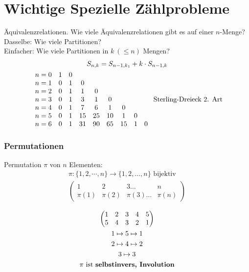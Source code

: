 \section{Wichtige Spezielle Zählprobleme}
Äquivalenzrelationen. Wie viele Äquivalenzrelationen gibt es auf einer $n$-Menge? \\
Dasselbe: Wie viele Partitionen? \\
Einfacher: Wie viele Partitionen in $k ~(\leq n)$ Mengen? \\
\begin{gather*}
	S_{n,k} = S_{n-1,k_1}+ k \cdot S_{n-1,k} \\
	\begin{array}{ c c c c c c c c c }
		n=0	&1	&0	\\
		n=1	&0	&1	&0	\\
		n=2	&0	&1	&1	&0	\\
		n=3	&0	&1	&3	&1	&0	\\
		n=4	&0	&1	&7	&6	&1	&0	\\
		n=5	&0	&1	&15	&25	&10	&1	&0	\\
		n=6	&0	&1	&31	&90	&65	&15	&1	&0	\\
	\end{array} \text{ Sterling-Dreieck 2. Art}\index{Stirling-Dreieck!2. Art}
\end{gather*}

\subsubsection{Permutationen}
Permutation $\pi$ von $n$ Elementen: \\
\begin{gather*}
	\pi : \{ 1, 2, \cdots , n \} \rightarrow \{ 1, 2, \dotsc , n \} \text{ bijektiv} \\
	\begin{pmatrix}
		1		&2		&3		\dots		&n		\\
		\pi(1)		&\pi(2)	&\pi(3)	\dots		&\pi(n)
	\end{pmatrix}
\end{gather*}
\begin{bsp*}
	\begin{gather*}
		\begin{pmatrix}
			1	&2	&3	&4	&5	\\
			5	&4	&3	&2	&1	
		\end{pmatrix} \\
		1 \mapsto 5 \mapsto 1 \\
		2 \mapsto 4 \mapsto 2 \\
		3 \mapsto 3 \\
		\pi \text{ ist \textbf{selbstinvers, Involution}}
	\end{gather*}
\end{bsp*}


